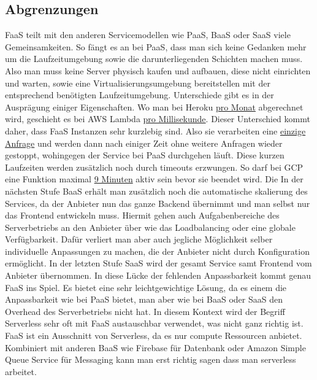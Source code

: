 \documentclass[12pt, a4paper]{article}
\begin{document}
\subsection{Abgrenzungen}
\ac{FaaS} teilt mit den anderen Servicemodellen wie \ac{PaaS}, \ac{BaaS} oder \ac{SaaS} viele Gemeinsamkeiten.
So fängt es an bei \ac{PaaS}, dass man sich keine Gedanken mehr um die Laufzeitumgebung sowie die darunterliegenden Schichten machen muss.
Also man muss keine Server physisch kaufen und aufbauen, diese nicht einrichten und warten, sowie eine Virtualisierungsumgebung bereitstellen mit der entsprechend benötigten Laufzeitumgebung.
Unterschiede gibt es in der Ausprägung einiger Eigenschaften.
Wo man bei Heroku \href{https://www.heroku.com/pricing}{pro Monat} abgerechnet wird, geschieht es bei AWS Lambda \href{https://aws.amazon.com/lambda/pricing/}{pro Millisekunde}.
Dieser Unterschied kommt daher, dass \ac{FaaS} Instanzen sehr kurzlebig sind.
Also sie verarbeiten eine \href{https://docs.aws.amazon.com/lambda/latest/dg/invocation-scaling.html}{einzige Anfrage} und werden dann nach einiger Zeit ohne weitere Anfragen wieder gestoppt, wohingegen der Service bei \ac{PaaS} durchgehen läuft.
Diese kurzen Laufzeiten werden zusätzlich noch durch timeouts erzwungen.
So darf bei \ac{GCP} eine Funktion maximal \href{https://cloud.google.com/functions/docs/concepts/exec?cloudshell=false#timeout}{9 Minuten} aktiv sein bevor sie beendet wird.
\newline
Die
\newline
In der nächsten Stufe \ac{BaaS} erhält man zusätzlich noch die automatische skalierung des Services, da der Anbieter nun das ganze Backend übernimmt und man selbst nur das Frontend entwickeln muss.
Hiermit gehen auch Aufgabenbereiche des Serverbetriebs an den Anbieter über wie das Loadbalancing oder eine globale Verfügbarkeit.
Dafür verliert man aber auch jegliche Möglichkeit selber individuelle Anpassungen zu machen, die der Anbieter nicht durch Konfiguration ermöglicht.
In der letzten Stufe \ac{SaaS} wird der gesamt Service samt Frontend vom Anbieter übernommen.
\newline
In diese Lücke der fehlenden Anpassbarkeit kommt genau \ac{FaaS} ins Spiel.
Es bietet eine sehr leichtgewichtige Lösung, da es einem die Anpassbarkeit wie bei \ac{PaaS} bietet, man aber wie bei \ac{BaaS} oder \ac{SaaS} den Overhead des Serverbetriebs nicht hat.
\newline
In diesem Kontext wird der Begriff Serverless sehr oft mit \ac{FaaS} austauschbar verwendet, was nicht ganz richtig ist.
\ac{FaaS} ist ein Ausschnitt von Serverless, da es nur compute Ressourcen anbietet.
Kombiniert mit anderen \ac{BaaS} wie Firebase für Datenbank oder Amazon Simple Queue Service für Messaging kann man erst richtig sagen dass man serverless arbeitet.
\end{document}
